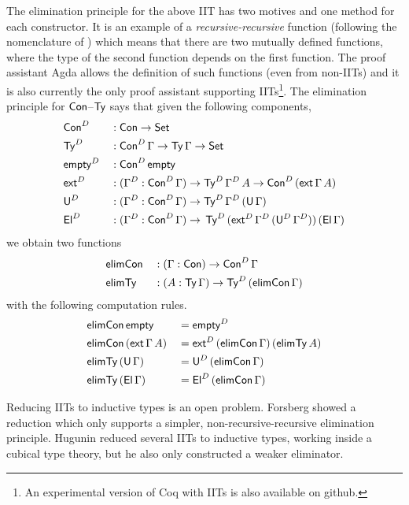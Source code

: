 \documentclass[a4paper,UKenglish,cleveref, autoref]{lipics-v2019}
\begin{document}
The elimination principle for the above IIT has two motives and one method
for each constructor. It is an example of a \emph{recursive-recursive}
function (following the nomenclature of \cite{forsberg-phd}) which
means that there are two mutually defined functions, where the type of
the second function depends on the first function. The proof assistant
Agda \cite{norell07thesis} allows the definition of such functions
(even from non-IITs) and it is also currently the only proof assistant
supporting IITs\footnote{An experimental version of Coq with IITs is also
  available on github.}. The elimination principle for $\mathsf{Con}$--$\mathsf{Ty}$ says that
given the following components,
\begin{alignat*}{5}
  & \mathsf{Con}^D && : \mathsf{Con}\rightarrow\mathsf{Set} \\
  & \mathsf{Ty}^D && : \mathsf{Con}^D\,\Gamma\rightarrow\mathsf{Ty}\,\Gamma\rightarrow\mathsf{Set} \\
  & \mathsf{empty}^D && : \mathsf{Con}^D\,\mathsf{empty} \\
  & \mathsf{ext}^D && : (\Gamma^D:\mathsf{Con}^D\,\Gamma)\rightarrow \mathsf{Ty}^D\,\Gamma^D\,A\rightarrow \mathsf{Con}^D\,(\mathsf{ext}\,\Gamma\,A) \\
  & \mathsf{U}^D && : (\Gamma^D:\mathsf{Con}^D\,\Gamma)\rightarrow \mathsf{Ty}^D\,\Gamma^D\,(\mathsf{U}\,\Gamma) \\
  & \mathsf{El}^D && : (\Gamma^D:\mathsf{Con}^D\,\Gamma)\rightarrow\,\mathsf{Ty}^D\,(\mathsf{ext}^D\,\Gamma^D\,(\mathsf{U}^D\,\Gamma^D))\,(\mathsf{El}\,\Gamma)
\end{alignat*}
we obtain two functions
\begin{alignat*}{5}
  & \mathsf{elimCon} && : (\Gamma:\mathsf{Con})\rightarrow \mathsf{Con}^D\,\Gamma \\
  & \mathsf{elimTy} && : (A:\mathsf{Ty}\,\Gamma)\rightarrow \mathsf{Ty}^D\,(\mathsf{elimCon}\,\Gamma)
\end{alignat*}
with the following computation rules.
\begin{alignat*}{5}
  & \mathsf{elimCon}\,\mathsf{empty} && = \mathsf{empty}^D \\
  & \mathsf{elimCon}\,(\mathsf{ext}\,\Gamma\,A) && = \mathsf{ext}^D\,(\mathsf{elimCon}\,\Gamma)\,(\mathsf{elimTy}\,A) \\
  & \mathsf{elimTy}\,(\mathsf{U}\,\Gamma) && = \mathsf{U}^D\,(\mathsf{elimCon}\,\Gamma) \\
  & \mathsf{elimTy}\,(\mathsf{El}\,\Gamma) && = \mathsf{El}^D\,(\mathsf{elimCon}\,\Gamma)
\end{alignat*}

Reducing IITs to inductive types is an open problem. Forsberg
\cite{forsberg-phd} showed a reduction which only supports a simpler,
non-recursive-recursive elimination principle. Hugunin \cite{jasper} reduced
several IITs to inductive types, working inside a cubical type theory, but he
also only constructed a weaker eliminator.
\end{document}
